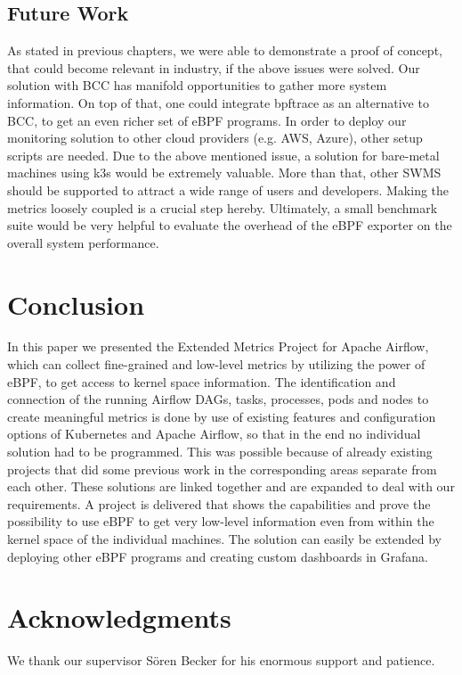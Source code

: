 \documentclass[a4paper,journal]{IEEEtran}
\begin{document}
\subsection{Future Work}
As stated in previous chapters, we were able to demonstrate a proof of concept, that could become relevant in industry, if the above issues were solved. Our solution with BCC has manifold opportunities to gather more system information. On top of that, one could integrate bpftrace as an alternative to BCC, to get an even richer set of eBPF programs. 
In order to deploy our monitoring solution to other cloud providers (e.g. AWS, Azure), other setup scripts are needed. Due to the above mentioned issue, a solution for bare-metal machines using k3s \cite{k3s} would be extremely valuable. 
More than that, other SWMS should be supported to attract a wide range of users and developers. Making the metrics loosely coupled is a crucial step hereby.
Ultimately, a small benchmark suite would be very helpful to evaluate the overhead of the eBPF exporter on the overall system performance.


\section{Conclusion}
\label{sec:conlusion}
In this paper we presented the Extended Metrics Project for Apache Airflow, which can collect fine-grained and low-level metrics by utilizing the power of eBPF, to get access to kernel space information. The identification and connection of the running Airflow DAGs, tasks, processes, pods and nodes to create meaningful metrics is done by use of existing features and configuration options of Kubernetes and Apache Airflow, so that in the end no individual solution had to be programmed. This was possible because of already existing projects that did some previous work in the corresponding areas separate from each other. These solutions are linked together and are expanded to deal with our requirements. A project is delivered that shows the capabilities and prove the possibility to use eBPF to get very low-level information even from within the kernel space of the individual machines. The solution can easily be extended by deploying other eBPF programs and creating custom dashboards in Grafana.

\section*{Acknowledgments}
We thank our supervisor Sören Becker for his enormous support and patience. 



	
\end{document}
